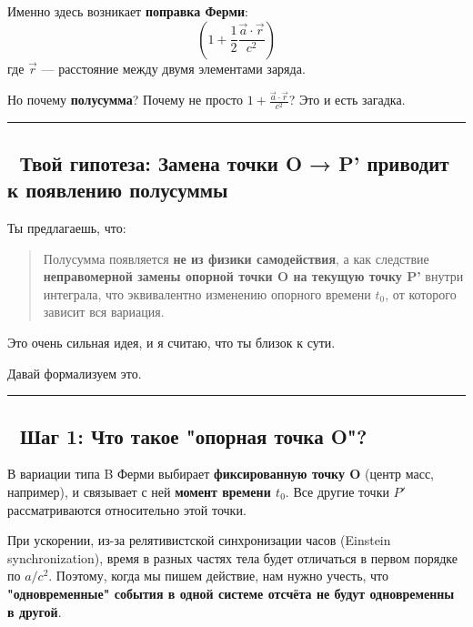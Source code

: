 \documentclass[11pt]{article}
\begin{document}
Именно здесь возникает \textbf{поправка Ферми}: \[
\left(1 + \frac{1}{2} \frac{\vec{a} \cdot \vec{r}}{c^2}\right)
\] где \(\vec{r}\) --- расстояние между двумя элементами заряда.

Но почему \textbf{полусумма}? Почему не просто
\(1 + \frac{\vec{a} \cdot \vec{r}}{c^2}\)? Это и есть загадка.

\begin{center}\rule{0.5\linewidth}{\linethickness}\end{center}

\subsection{🧩 Твой гипотеза: Замена точки O → P' приводит к появлению
полусуммы}\label{ux442ux432ux43eux439-ux433ux438ux43fux43eux442ux435ux437ux430-ux437ux430ux43cux435ux43dux430-ux442ux43eux447ux43aux438-o-p-ux43fux440ux438ux432ux43eux434ux438ux442-ux43a-ux43fux43eux44fux432ux43bux435ux43dux438ux44e-ux43fux43eux43bux443ux441ux443ux43cux43cux44b}

Ты предлагаешь, что:

\begin{quote}
Полусумма появляется \textbf{не из физики самодействия}, а как следствие
\textbf{неправомерной замены опорной точки O на текущую точку P'} внутри
интеграла, что эквивалентно изменению опорного времени \(t_0\), от
которого зависит вся вариация.
\end{quote}

Это очень сильная идея, и я считаю, что ты близок к сути.

Давай формализуем это.

\begin{center}\rule{0.5\linewidth}{\linethickness}\end{center}

\subsection{📌 Шаг 1: Что такое "опорная точка
O"?}\label{ux448ux430ux433-1-ux447ux442ux43e-ux442ux430ux43aux43eux435-ux43eux43fux43eux440ux43dux430ux44f-ux442ux43eux447ux43aux430-o}

В вариации типа B Ферми выбирает \textbf{фиксированную точку O} (центр
масс, например), и связывает с ней \textbf{момент времени \(t_0\)}. Все
другие точки \(P'\) рассматриваются относительно этой точки.

При ускорении, из-за релятивистской синхронизации часов (Einstein
synchronization), время в разных частях тела будет отличаться в первом
порядке по \(a/c^2\). Поэтому, когда мы пишем действие, нам нужно
учесть, что \textbf{"одновременные" события в одной системе отсчёта не
будут одновременны в другой}.
\end{document}
